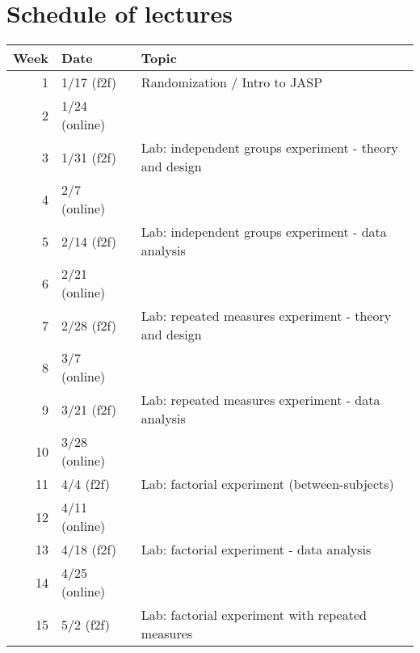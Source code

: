 \documentclass[10pt]{article}
\begin{document}
\section*{Schedule of lectures}
\label{sec-10}
\begin{center}
\begin{tabular}{rll}
Week & Date & Topic\\
\hline
1 & 1/17 (f2f) & Randomization / Intro to JASP\\
2 & 1/24 (online) & \\
3 & 1/31 (f2f) & Lab: independent groups experiment - theory and design\\
4 & 2/7 (online) & \\
5 & 2/14 (f2f) & Lab: independent groups experiment - data analysis\\
6 & 2/21 (online) & \\
7 & 2/28 (f2f) & Lab: repeated measures experiment - theory and design\\
8 & 3/7 (online) & \\
9 & 3/21 (f2f) & Lab: repeated measures experiment - data analysis\\
10 & 3/28 (online) & \\
11 & 4/4 (f2f) & Lab: factorial experiment (between-subjects)\\
12 & 4/11 (online) & \\
13 & 4/18 (f2f) & Lab: factorial experiment - data analysis\\
14 & 4/25 (online) & \\
15 & 5/2 (f2f) & Lab: factorial experiment with repeated measures\\
\end{tabular}
\end{center}
\end{document}

